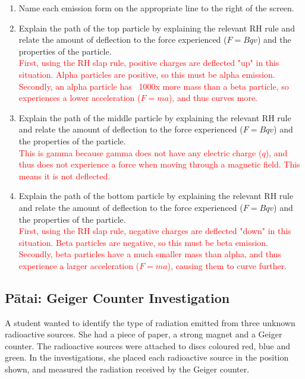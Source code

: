 \documentclass[12pt]{report}
\makeatletter
\DeclareRobustCommand{\StudentVSpace}[2]{%
	\ifthenelse{\boolean{@answer}}
	{\textcolor{red}{\\#1}}
	{\vspace{#2}}
}
\makeatother
\begin{document}
\begin{enumerate}
	\item Name each emission form on the appropriate line to the right of the screen.

	\item Explain the path of the top particle by explaining the relevant RH rule and relate the amount of deflection to the force experienced ($F=Bqv$) and the properties of the particle.
	      \StudentVSpace{
		      First, using the RH slap rule, positive charges are deflected "up" in this situation. Alpha particles are positive, so this must be alpha emission. Secondly, an alpha particle has ~1000x more mass than a beta particle, so experiences a lower acceleration ($F=ma$), and thus curves more.
	      }{3cm}

	\item Explain the path of the middle particle by explaining the relevant RH rule and relate the amount of deflection to the force experienced ($F=Bqv$) and the properties of the particle.
	      \StudentVSpace{
		      This is gamma because gamma does not have any electric charge ($q$), and thus does not experience a force when moving through a magnetic field. This means it is not deflected.
	      }{3cm}

	\item Explain the path of the bottom particle by explaining the relevant RH rule and relate the amount of deflection to the force experienced ($F=Bqv$) and the properties of the particle.
	      \StudentVSpace{
		      First, using the RH slap rule, negative charges are deflected "down" in this situation. Beta particles are negative, so this must be beta emission. Secondly, beta particles have a much smaller mass than alpha, and thus experience a larger acceleration ($F=ma$), causing them to curve further.
	      }{3cm}
\end{enumerate}

\newpage
\subsection{Pātai: Geiger Counter Investigation}
A student wanted to identify the type of radiation emitted from three unknown radioactive sources. She had a piece of paper, a strong magnet and a Geiger counter. The radioactive sources were attached to discs coloured red, blue and green. In the investigations, she placed each radioactive source in the position shown, and measured the radiation received by the Geiger counter.
\end{document}
